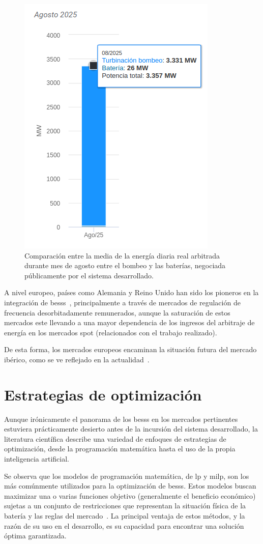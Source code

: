 \begin{figure}
  \centering
  \includegraphics[width=0.4\linewidth]{figures/comparacion-energia-ciclada.png}
  \caption[Comparación de la energía diaria arbitrada.]{Comparación entre la media de la energía diaria real arbitrada durante mes de agosto entre el bombeo y las baterías, negociada públicamente por el sistema desarrollado.}%
  \label{fig:comparacion-energia-ciclada}
\end{figure}

A nivel europeo, países como Alemania y Reino Unido han sido los pioneros en la integración de \glspl{bess}~\cite{kivipelto2017grid, tejada2019review}, principalmente a través de mercados de regulación de frecuencia desorbitadamente remunerados, aunque la saturación de estos mercados este llevando a una mayor dependencia de los ingresos del arbitraje de energía en los mercados spot (relacionados con el trabajo realizado).

De esta forma, los mercados europeos encaminan la situación futura del mercado ibérico, como se ve reflejado en la actualidad~\cite{kumar2019strategic}.

\section{Estrategias de optimización}%
\label{makereference2.2}

Aunque irónicamente el panorama de los \glspl{bess} en los mercados pertinentes estuviera prácticamente desierto antes de la incursión del sistema desarrollado, la literatura científica describe una variedad de enfoques de estrategias de optimización, desde la programación matemática hasta el uso de la propia inteligencia artificial.

Se observa que los modelos de programación matemática, de \gls{lp} y \gls{milp}, son los más comúnmente utilizados para la optimización de \glspl{bess}. Estos modelos buscan maximizar una o varias funciones objetivo (generalmente el beneficio económico) sujetas a un conjunto de restricciones que representan la situación física de la batería y las reglas del mercado~\cite{mendoza2023review}. La principal ventaja de estos métodos, y la razón de su uso en el desarrollo, es su capacidad para encontrar una solución óptima garantizada.

